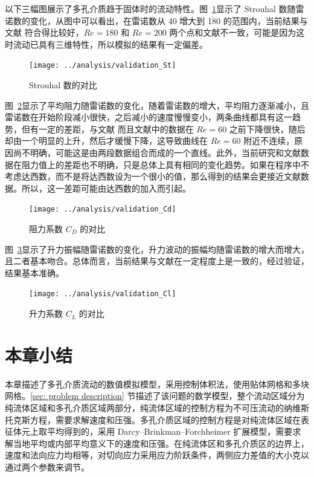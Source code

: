 以下三幅图展示了多孔介质趋于固体时的流动特性。图~\ref{fig: validation-St}显示了 Strouhal 数随雷诺数的变化，从图中可以看出，在雷诺数从 40 增大到 180 的范围内，当前结果与文献  符合得比较好，$Re=180$ 和 $Re=200$ 两个点和文献不一致，可能是因为这时流动已具有三维特性，所以模拟的结果有一定偏差。

\begin{figure}
	\centering
	\texttt{[image: ../analysis/validation\_St]}
	\caption{Strouhal 数的对比}
	\label{fig: validation-St}
\end{figure}

图~\ref{fig: validation-Cd}显示了平均阻力随雷诺数的变化，随着雷诺数的增大，平均阻力逐渐减小，且雷诺数在开始阶段减小很快，之后减小的速度慢慢变小，两条曲线都具有这一趋势，但有一定的差距，与文献  而且文献中的数据在 $Re=60$ 之前下降很快，随后却由一个明显的上升，然后才缓慢下降，这导致曲线在 $Re=60$ 附近不连续，原因尚不明确，可能这是由两段数据组合而成的一个直线。此外，当前研究和文献数据在阻力值上的差距也不明确，只是总体上具有相同的变化趋势。如果在程序中不考虑达西数，而不是将达西数设为一个很小的值，那么得到的结果会更接近文献数据。所以，这一差距可能由达西数的加入而引起。

\begin{figure}[ht]
	\centering
	\texttt{[image: ../analysis/validation\_Cd]}
	\caption{阻力系数 $C_D$ 的对比}
	\label{fig: validation-Cd}
\end{figure}

图~\ref{fig: validation-Cl}显示了升力振幅随雷诺数的变化，升力波动的振幅均随雷诺数的增大而增大，且二者基本吻合。总体而言，当前结果与文献在一定程度上是一致的，经过验证，结果基本准确。

\begin{figure}[ht]
	\centering
	\texttt{[image: ../analysis/validation\_Cl]}
	\caption{升力系数 $C_L$ 的对比}
	\label{fig: validation-Cl}
\end{figure}

\section{本章小结}

本章描述了多孔介质流动的数值模拟模型，采用控制体积法，使用贴体网格和多块网格。\ref{sec: problem description} 节描述了该问题的数学模型，整个流动区域分为纯流体区域和多孔介质区域两部分，纯流体区域的控制方程为不可压流动的纳维斯托克斯方程，需要求解速度和压强。多孔介质区域的控制方程是对纯流体区域在表征体元上取平均得到的，采用 Darcy–Brinkman–Forchheimer 扩展模型，需要求解当地平均或内部平均意义下的速度和压强。在纯流体区和多孔介质区的边界上，速度和法向应力均相等，对切向应力采用应力阶跃条件，两侧应力差值的大小克以通过两个参数来调节。

